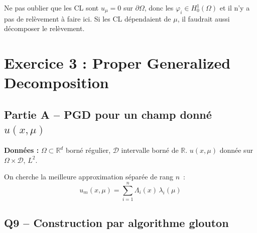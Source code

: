 \documentclass[11pt,a4paper]{article}
\begin{document}
\begin{warningbox}[Pi\`ege Q8]
Ne pas oublier que les CL sont $u_\mu = 0$ sur $\partial\Omega$, donc les $\varphi_i \in H^1_0(\Omega)$ et il n'y a pas de rel\`evement \`a faire ici. Si les CL d\'ependaient de $\mu$, il faudrait aussi d\'ecomposer le rel\`evement.
\end{warningbox}

\section{Exercice 3 : Proper Generalized Decomposition}

\subsection{Partie A -- PGD pour un champ donn\'e $u(x,\mu)$}

\textbf{Donn\'ees :} $\Omega \subset \mathbb{R}^d$ born\'e r\'egulier, $\mathcal{D}$ intervalle born\'e de $\mathbb{R}$.
$u(x,\mu)$ donn\'ee sur $\Omega\times\mathcal{D}$, $L^2$.

On cherche la meilleure approximation s\'epar\'ee de rang $n$~:
\[
u_m(x,\mu) = \sum_{i=1}^{n} \Lambda_i(x)\,\lambda_i(\mu)
\]

\subsection{Q9 -- Construction par algorithme glouton}
\end{document}
